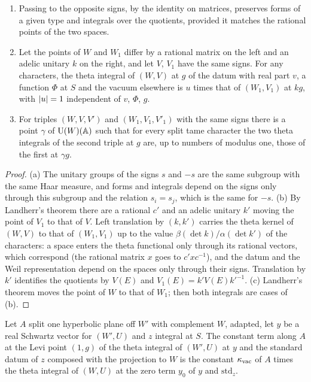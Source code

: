 \begin{lemma}\label{lem:change-of-point}
\begin{enumerate}[label=\textup{(\alph*)}]
\item Passing to the opposite signs, by the identity on matrices, preserves forms of a given type and integrals over the quotients, provided it matches the rational points of the two spaces.
\item Let the points of $W$ and $W_1$ differ by a rational matrix on the left and an adelic unitary $k$ on the right, and let $V$, $V_1$ have the same signs. For any characters, the theta integral of $(W,V)$
at $g$ of the datum with real part $v$, a function $\Phi$ at $S$ and the vacuum elsewhere is $u$ times that of $(W_1,V_1)$ at $kg$, with $\lvert u\rvert=1$ independent of $v$, $\Phi$, $g$.
\item For triples $(W,V,V')$ and $(W_1,V_1,V'_1)$ with the same signs there is a point $\gamma$ of $\operatorname{U}(W)(\mathbb{A})$ such that for every split tame character the two theta integrals of the second triple at $g$ are, up to
numbers of modulus one, those of the first at $\gamma g$.
\end{enumerate}
\end{lemma}

\begin{proof}
(a) The unitary groups of the signs $s$ and $-s$ are the same subgroup with the same Haar measure, and forms and integrals depend on the signs only through this subgroup and the relation $s_i=s_j$, which is the
same for $-s$. (b) By Landherr's theorem there are a rational $c'$ and an adelic unitary $k'$ moving the point of $V_1$ to that of $V$. Left translation by $(k,k')$ carries the theta kernel of $(W,V)$ to that of
$(W_1,V_1)$ up to the value $\beta(\det k)/\alpha(\det k')$ of the characters: a space enters the theta functional only through its rational vectors, which correspond (the rational matrix $x$ goes to $c'xc^{-1}$),
and the datum and the Weil representation depend on the spaces only through their signs. Translation by $k'$ identifies the quotients by $V(E)$ and $V_1(E)=k'V(E)k'^{-1}$. (c) Landherr's theorem moves the point of
$W$ to that of $W_1$; then both integrals are cases of (b).
\end{proof}

\begin{lemma}\label{lem:small-side}
Let $A$ split one hyperbolic plane off $W'$ with complement $W$, adapted, let $y$ be a real Schwartz vector for $(W',U)$ and $z$ integral at $S$. The constant term along $A$ at the Levi point $(1,g)$ of the theta
integral of $(W',U)$ at $y$ and the standard datum of $z$ composed with the projection to $W$ is the constant $\kappa_{\rm vac}$ of $A$ times the theta integral of $(W,U)$ at the zero term $y_0$ of $y$ and
$\mathrm{std}_z$.
\end{lemma}

